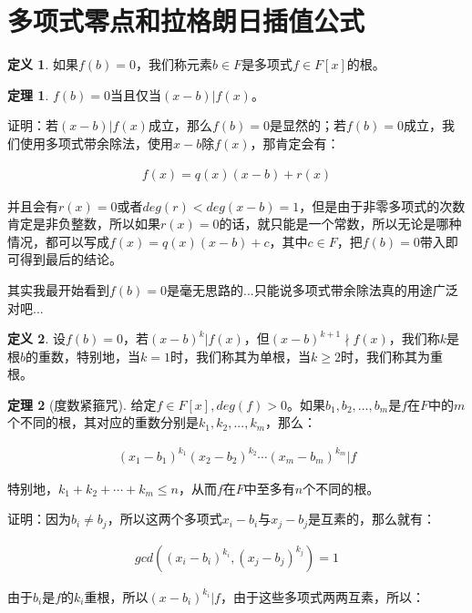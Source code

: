 \documentclass[12pt, a4paper, oneside]{ctexart}
\theoremstyle{definition}
\newtheorem*{definition}{定义}
\newtheorem*{theorem}{定理}
\begin{document}
\section*{多项式零点和拉格朗日插值公式}

\begin{definition}
如果$f(b)=0$，我们称元素$b\in F$是多项式$f\in F[x]$的根。
\end{definition}

\begin{theorem}
$f(b)=0$当且仅当$(x-b)|f(x)$。
\end{theorem}

证明：若$(x-b)|f(x)$成立，那么$f(b)=0$是显然的；若$f(b)=0$成立，我们使用多项式带余除法，使用$x-b$除$f(x)$，那肯定会有：

\begin{align*}
f(x)=q(x)(x-b)+r(x)
\end{align*}

并且会有$r(x)=0$或者$deg(r)<deg(x-b)=1$，但是由于非零多项式的次数肯定是非负整数，所以如果$r(x)=0$的话，就只能是一个常数，所以无论是哪种情况，都可以写成$f(x)=q(x)(x-b)+c$，其中$c\in F$，把$f(b)=0$带入即可得到最后的结论。

其实我最开始看到$f(b)=0$是毫无思路的...只能说多项式带余除法真的用途广泛对吧...

\begin{definition}
设$f(b)=0$，若$(x-b)^k|f(x)$，但$(x-b)^{k+1}\nmid f(x)$，我们称$k$是根$b$的重数，特别地，当$k=1$时，我们称其为单根，当$k\geqslant2$时，我们称其为重根。
\end{definition}

\begin{theorem}[度数紧箍咒]
给定$f\in F[x],deg(f)>0$。如果$b_1,b_2,...,b_m$是$f$在$F$中的$m$个不同的根，其对应的重数分别是$k_1,k_2,...,k_m$，那么：

\begin{align*}
(x_1-b_1)^{k_1}(x_2-b_2)^{k_2}\cdots(x_m-b_m)^{k_m}|f
\end{align*}

特别地，$k_1+k_2+\cdots+k_m\leqslant n$，从而$f$在$F$中至多有$n$个不同的根。
\end{theorem}

证明：因为$b_i\neq b_j$，所以这两个多项式$x_i-b_i$与$x_j-b_j$是互素的，那么就有：

\begin{align*}
gcd((x_i-b_i)^{k_i},(x_j-b_j)^{k_j})=1
\end{align*}

由于$b_i$是$f$的$k_i$重根，所以$(x-b_i)^{k_i}|f$，由于这些多项式两两互素，所以：
\end{document}
